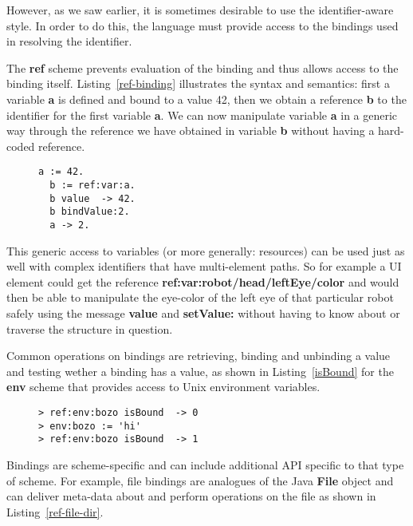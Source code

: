 \documentclass[preprint,authoryear]{acm_proc_article-sp}
\begin{document}
However, as we saw earlier, it is sometimes
desirable to use the identifier-aware style.  In order to do this, the language
must provide access to the bindings used in resolving the identifier.

The {\bf ref} scheme prevents evaluation of the binding and thus allows access
to the binding itself.  Listing~\ref{ref-binding} illustrates the syntax and semantics:
first a variable {\bf a} is defined and bound to a value 42, then we obtain a reference {\bf b} to
the identifier for the first variable {\bf a}.  We can now manipulate variable {\bf a} 
in a generic way through the reference we have obtained in variable {\bf b} without
having a hard-coded reference. 


\begin{figure}[htbp]
\begin{lstlisting}[style=L,label=ref-binding,caption=Accessing a variable via its binding.]
  a := 42.
  b := ref:var:a.
  b value  -> 42.
  b bindValue:2.
  a -> 2.
\end{lstlisting}
\end{figure}

This generic access to variables (or more generally: resources) can be used just as well
with complex identifiers that have multi-element paths.  So for example a UI element
could get the reference {\bf ref:var:robot/head/leftEye/color} and would then be
able to manipulate the eye-color of the left eye of that particular robot safely using
the message {\bf value} and {\bf setValue:}
without having to know about or traverse the structure in question.

Common operations on bindings are retrieving, binding and unbinding a value and testing 
wether a binding has a value, as shown in Listing~\ref{isBound} for the {\bf env} scheme
that provides access to Unix environment variables.


\begin{figure}[htbp]
\begin{lstlisting}[style=L,label=isBound,caption=Is environment variable set?]
> ref:env:bozo isBound  -> 0
> env:bozo := 'hi'
> ref:env:bozo isBound  -> 1
\end{lstlisting}
\end{figure}

Bindings are scheme-specific and can include additional API specific to that type of scheme.
For example, file bindings are analogues of the Java {\bf File} object and can deliver
meta-data about and perform operations on the file as shown in Listing~\ref{ref-file-dir}.
\end{document}

